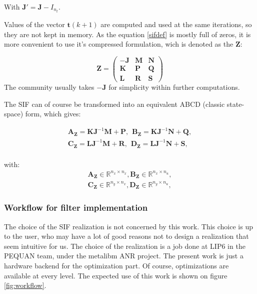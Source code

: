 	With $\boldsymbol{J'} = \boldsymbol{J} - I_{n_t}$.

	Values of the vector $\boldsymbol{t}(k+1)$ are computed and used at the same iterations, so they are not kept in memory.
	As the equation \ref{sifdef} is mostly full of zeros, it is more convenient to use it’s compressed formulation, wich is denoted
	as the $\boldsymbol{Z}$:
	
	\begin{equation} \label{zmatrix}
		\boldsymbol{Z}=
		\begin{pmatrix}
			\boldsymbol{-J} & \boldsymbol{M} & \boldsymbol{N} \\
			\boldsymbol{K} & \boldsymbol{P} & \boldsymbol{Q} \\
			\boldsymbol{L} & \boldsymbol{R} & \boldsymbol{S} 
		\end{pmatrix}
	\end{equation}
	The community usually takes $-\boldsymbol{J}$ for simplicity within further computations.

	The SIF can of course be transformed into an equivalent ABCD (classic state-space) form, which gives:

	\begin{eqnarray} \label{abcdtranspose}
		\boldsymbol{A_Z} = \boldsymbol{KJ}^{-1}\boldsymbol{M} +\boldsymbol{P}, \hspace{5pt}
		\boldsymbol{B_Z} = \boldsymbol{KJ}^{-1}\boldsymbol{N} +\boldsymbol{Q}, \nonumber \\
		\boldsymbol{C_Z} = \boldsymbol{LJ}^{-1}\boldsymbol{M} +\boldsymbol{R}, \hspace{5pt}
		\boldsymbol{D_Z} = \boldsymbol{LJ}^{-1}\boldsymbol{N} +\boldsymbol{S}, \nonumber \\
	\end{eqnarray}

	with:
	\begin{eqnarray}
		\boldsymbol{A_Z} \in \mathbb{R}^{n_x \times n_x},
		\boldsymbol{B_Z} \in \mathbb{R}^{n_x \times n_u}, \nonumber \\
		\boldsymbol{C_Z} \in \mathbb{R}^{n_y \times n_x},
		\boldsymbol{D_Z} \in \mathbb{R}^{n_y \times n_u},
	\end{eqnarray}

	\subsubsection{Workflow for filter implementation}
		The choice of the SIF realization is not concerned by this work.
		This choice is up to the user, who may have a lot of good reasons not to design a realization that seem intuitive for us.
		The choice of the realization is a job done at LIP6 in the PEQUAN team, under the metalibm ANR project.
		The present work is just a hardware backend for the optimization part.
		Of course, optimizations are available at every level.
		The expected use of this work is shown on figure \ref{fig:workflow}.


